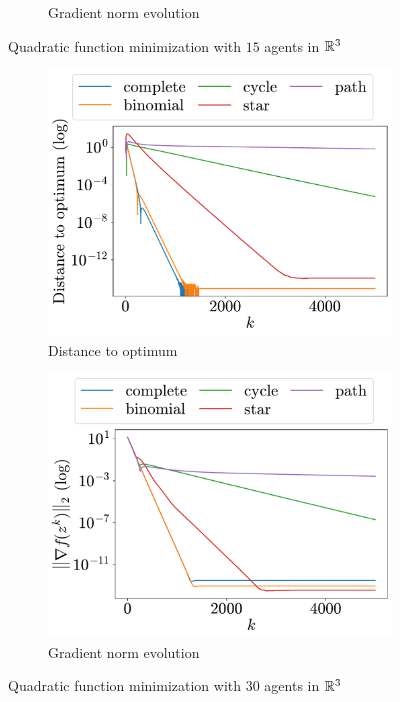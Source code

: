 \documentclass[a4paper,11pt,oneside]{book}
\begin{document}
\begin{figure}[H]
\begin{subfigure}[t]{0.46\linewidth}
            \caption{Gradient norm evolution}
      \end{subfigure}
      \caption{Quadratic function minimization with $15$ agents in ${\mathbb{R}}^{3}$}
      \label{fig:quadratic_15_3}
\end{figure}

\begin{figure}[H]
      \centering
      \begin{subfigure}[t]{0.46\linewidth}
            \centering
            \includegraphics[width=\linewidth]{./figs/quadratic/30_3/distance.pdf} 
            \caption{Distance to optimum}
      \end{subfigure}
      \hfill
      \begin{subfigure}[t]{0.46\linewidth}
            \centering
            \includegraphics[width=\linewidth]{./figs/quadratic/30_3/gradient.pdf} 
            \caption{Gradient norm evolution}
      \end{subfigure}
      \caption{Quadratic function minimization with $30$ agents in ${\mathbb{R}}^{3}$}
      \label{fig:quadratic_30_3}
\end{figure}
\end{document}
